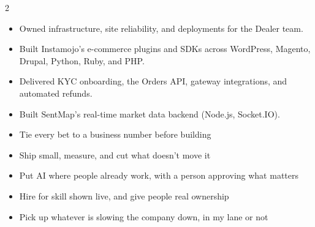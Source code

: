 \documentclass[10pt,a4paper,withhyper,ragged2e]{altacv}
\begin{document}
\begin{paracol}{2}
\divider

\begin{itemize}
\item Owned infrastructure, site reliability, and deployments for the Dealer team.
\end{itemize}

\divider

\begin{itemize}
\item Built Instamojo's e-commerce plugins and SDKs across WordPress, Magento, Drupal, Python, Ruby, and PHP.
\item Delivered KYC onboarding, the Orders API, gateway integrations, and automated refunds.
\end{itemize}

\divider

\begin{itemize}
\item Built SentMap's real-time market data backend (Node.js, Socket.IO).
\end{itemize}

\switchcolumn

%

\begin{itemize}
\item Tie every bet to a business number before building
\item Ship small, measure, and cut what doesn't move it
\item Put AI where people already work, with a person approving what matters
\item Hire for skill shown live, and give people real ownership
\item Pick up whatever is slowing the company down, in my lane or not
\end{itemize}


\end{paracol}
\end{document}
